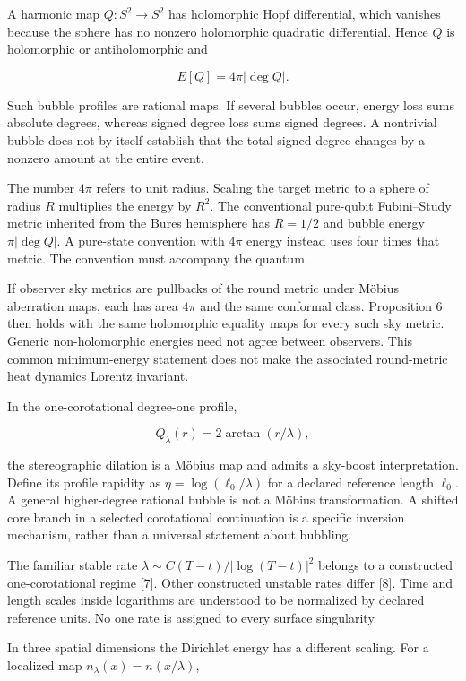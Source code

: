 \documentclass[
  11pt,
  a4paper,
]{article}
\begin{document}
A harmonic map \(Q:S^2\to S^2\) has holomorphic Hopf differential, which vanishes because the sphere has no nonzero holomorphic quadratic differential. Hence \(Q\) is holomorphic or antiholomorphic and

\[
E[Q]=4\pi|\deg Q|.
\]

Such bubble profiles are rational maps. If several bubbles occur, energy loss sums absolute degrees, whereas signed degree loss sums signed degrees. A nontrivial bubble does not by itself establish that the total signed degree changes by a nonzero amount at the entire event.

The number \(4\pi\) refers to unit radius. Scaling the target metric to a sphere of radius \(R\) multiplies the energy by \(R^2\). The conventional pure-qubit Fubini--Study metric inherited from the Bures hemisphere has \(R=1/2\) and bubble energy \(\pi|\deg Q|\). A pure-state convention with \(4\pi\) energy instead uses four times that metric. The convention must accompany the quantum.

If observer sky metrics are pullbacks of the round metric under Möbius aberration maps, each has area \(4\pi\) and the same conformal class. Proposition 6 then holds with the same holomorphic equality maps for every such sky metric. Generic non-holomorphic energies need not agree between observers. This common minimum-energy statement does not make the associated round-metric heat dynamics Lorentz invariant.

In the one-corotational degree-one profile,

\[
Q_\lambda(r)=2\arctan(r/\lambda),
\]

the stereographic dilation is a Möbius map and admits a sky-boost interpretation. Define its profile rapidity as \(\eta=\log(\ell_0/\lambda)\) for a declared reference length \(\ell_0\). A general higher-degree rational bubble is not a Möbius transformation. A shifted core branch in a selected corotational continuation is a specific inversion mechanism, rather than a universal statement about bubbling.

The familiar stable rate \(\lambda\sim C(T-t)/|\log(T-t)|^2\) belongs to a constructed one-corotational regime {[}7{]}. Other constructed unstable rates differ {[}8{]}. Time and length scales inside logarithms are understood to be normalized by declared reference units. No one rate is assigned to every surface singularity.

In three spatial dimensions the Dirichlet energy has a different scaling. For a localized map \(n_\lambda(x)=n(x/\lambda)\),
\end{document}
